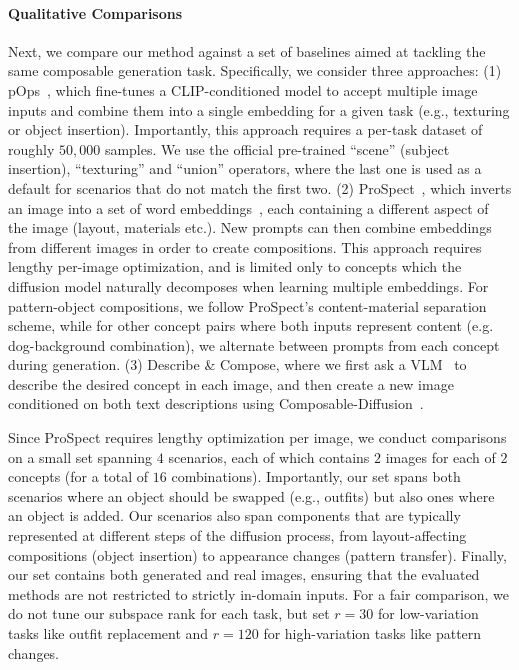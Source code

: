 \paragraph{\textbf{Qualitative Comparisons}}
Next, we compare our method against a set of baselines aimed at tackling the same composable generation task. Specifically, we consider three approaches: (1) pOps~\citep{richardson2024popsphotoinspireddiffusionoperators}, which fine-tunes a CLIP-conditioned model to accept multiple image inputs and combine them into a single embedding for a given task (e.g., texturing or object insertion). Importantly, this approach requires a per-task dataset of roughly $50,000$ samples. We use the official pre-trained ``scene'' (subject insertion), ``texturing'' and ``union'' operators, where the last one is used as a default for scenarios that do not match the first two. (2) ProSpect~\citep{zhang2023prospectpromptspectrumattributeaware}, which inverts an image into a set of word embeddings~\citep{gal2022textual}, each containing a different aspect of the image (layout, materials etc.). New prompts can then combine embeddings from different images in order to create compositions. This approach requires lengthy per-image optimization, and is limited only to concepts which the diffusion model naturally decomposes when learning multiple embeddings. For pattern-object compositions, we follow ProSpect's content-material separation scheme, while for other concept pairs where both inputs represent content (e.g. dog-background combination), we alternate between prompts from each concept during generation. (3) Describe \& Compose, where we first ask a VLM~\citep{liu2023improvedllava} to describe the desired concept in each image, and then create a new image conditioned on both text descriptions using Composable-Diffusion~\cite{liu2023compositionalvisualgenerationcomposable}.

Since ProSpect requires lengthy optimization per image, we conduct comparisons on a small set spanning $4$ scenarios, each of which contains $2$ images for each of $2$ concepts (for a total of $16$ combinations). Importantly, our set spans both scenarios where an object should be swapped (e.g., outfits) but also ones where an object is added. Our scenarios also span components that are typically represented at different steps of the diffusion process, from layout-affecting compositions (object insertion) to appearance changes (pattern transfer). Finally, our set contains both generated and real images, ensuring that the evaluated methods are not restricted to strictly in-domain inputs. For a fair comparison, we do not tune our subspace rank for each task, but set $r=30$ for low-variation tasks like outfit replacement and $r=120$ for high-variation tasks like pattern changes.

